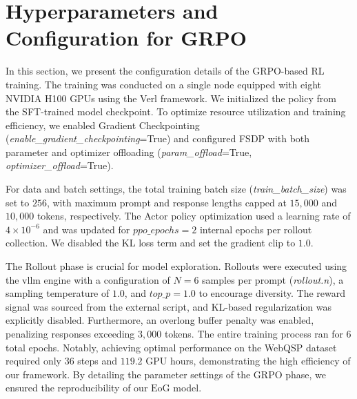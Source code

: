 \section{Hyperparameters and Configuration for GRPO}


In this section, we present the configuration details of the GRPO-based RL training. The training was conducted on a single node equipped with eight NVIDIA H100 GPUs using the Verl framework.
We initialized the policy from the SFT-trained model checkpoint.
To optimize resource utilization and training efficiency, we enabled Gradient Checkpointing (\textit{enable\_gradient\_checkpointing}=True) and configured FSDP with both parameter and optimizer offloading (\textit{param\_offload}=True, \textit{optimizer\_offload}=True).

For data and batch settings, the total training batch size (\textit{train\_batch\_size}) was set to $256$, with maximum prompt and response lengths capped at $15,000$ and $10,000$ tokens, respectively. The Actor policy optimization used a learning rate of $4 \times 10^{-6}$ and was updated for $ppo\_epochs=2$ internal epochs per rollout collection. We disabled the KL loss term and set the gradient clip to $1.0$.

The Rollout phase is crucial for model exploration. Rollouts were executed using the vllm engine with a configuration of $N=6$ samples per prompt (\textit{rollout.n}), a sampling temperature of $1.0$, and $top\_p=1.0$ to encourage diversity. The reward signal was sourced from the external script, and KL-based regularization was explicitly disabled. Furthermore, an overlong buffer penalty was enabled, penalizing responses exceeding $3,000$ tokens. The entire training process ran for $6$ total epochs. Notably, achieving optimal performance on the WebQSP dataset required only $36$ steps and $119.2$ GPU hours, demonstrating the high efficiency of our framework. By detailing the parameter settings of the GRPO phase, we ensured the reproducibility of our $\text{EoG}$ model.

